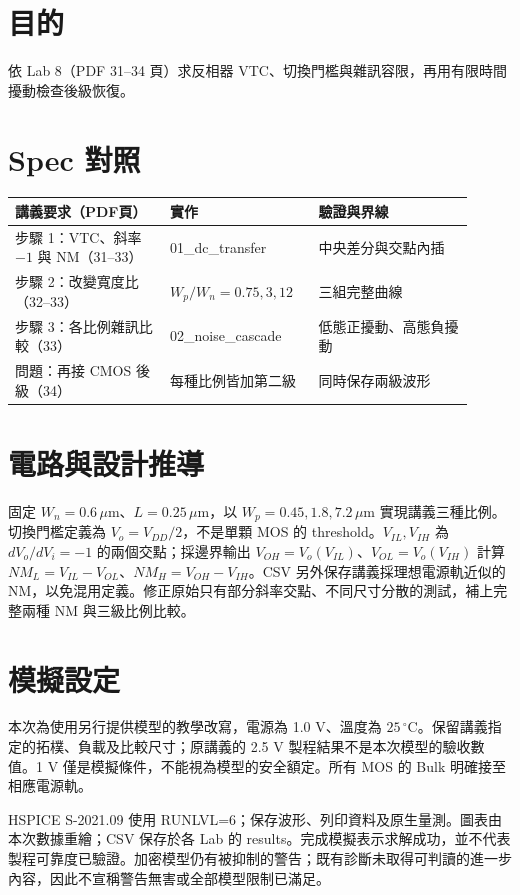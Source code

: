 \section{目的}
依 Lab 8（PDF 31--34 頁）求反相器 VTC、切換門檻與雜訊容限，再用有限時間擾動檢查後級恢復。

\section{Spec 對照}
\begin{longtable}{p{0.31\linewidth}p{0.29\linewidth}p{0.31\linewidth}}
\toprule
講義要求（PDF頁） & 實作 & 驗證與界線 \\\midrule
步驟 1：VTC、斜率 $-1$ 與 NM（31--33） & 01\_dc\_transfer & 中央差分與交點內插 \\
步驟 2：改變寬度比（32--33） & $W_p/W_n=0.75,3,12$ & 三組完整曲線 \\
步驟 3：各比例雜訊比較（33） & 02\_noise\_cascade & 低態正擾動、高態負擾動 \\
問題：再接 CMOS 後級（34） & 每種比例皆加第二級 & 同時保存兩級波形 \\
\bottomrule
\end{longtable}


\section{電路與設計推導}
固定 $W_n=0.6\,\mu$m、$L=0.25\,\mu$m，以 $W_p=0.45,1.8,7.2\,\mu$m 實現講義三種比例。切換門檻定義為 $V_o=V_{DD}/2$，不是單顆 MOS 的 threshold。$V_{IL},V_{IH}$ 為 $dV_o/dV_i=-1$ 的兩個交點；採邊界輸出 $V_{OH}=V_o(V_{IL})$、$V_{OL}=V_o(V_{IH})$ 計算 $NM_L=V_{IL}-V_{OL}$、$NM_H=V_{OH}-V_{IH}$。CSV 另外保存講義採理想電源軌近似的 NM，以免混用定義。修正原始只有部分斜率交點、不同尺寸分散的測試，補上完整兩種 NM 與三級比例比較。

\section{模擬設定}
本次為使用另行提供模型的教學改寫，電源為 1.0 V、溫度為 $25\,^{\circ}\mathrm C$。保留講義指定的拓樸、負載及比較尺寸；原講義的 2.5 V 製程結果不是本次模型的驗收數值。1 V 僅是模擬條件，不能視為模型的安全額定。所有 MOS 的 Bulk 明確接至相應電源軌。

HSPICE S-2021.09 使用 RUNLVL=6；保存波形、列印資料及原生量測。圖表由本次數據重繪；CSV 保存於各 Lab 的 results。完成模擬表示求解成功，並不代表製程可靠度已驗證。加密模型仍有被抑制的警告；既有診斷未取得可判讀的進一步內容，因此不宣稱警告無害或全部模型限制已滿足。

